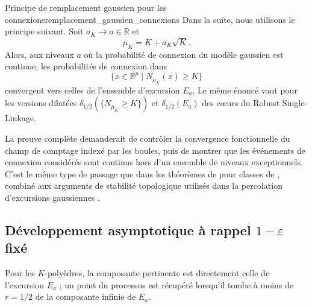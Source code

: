 \begin{Resultat}{Principe de remplacement gaussien pour les connexions}{remplacement_gaussien_connexions}
Dans la suite, nous utilisons le principe suivant. Soit $a_K\to a\in\mathbb R$ et
\[
    \mu_K=K+a_K\sqrt K.
\]
Alors, aux niveaux $a$ où la probabilité de connexion du modèle gaussien est continue, les probabilités de connexion dans
\[
    \{x \in \mathbb R^p \mid N_{\mu_K}(x)\ge K\}
\]
convergent vers celles de l'ensemble d'excursion $E_a$. Le même énoncé vaut pour les versions dilatées $\delta_{1/2}(\{N_{\mu_K}\ge K\})$ et $\delta_{1/2}(E_a)$ des cœurs du Robust Single-Linkage.
\end{Resultat}

\begin{Preuve}[Commentaire]
La preuve complète demanderait de contrôler la convergence fonctionnelle du champ de comptage indexé par les boules, puis de montrer que les événements de connexion considérés sont continus hors d'un ensemble de niveaux exceptionnels. C'est le même type de passage que dans les théorèmes de  pour classes de  \cite{VanDerVaartWellner1996}, combiné aux arguments de stabilité topologique utilisés dans la percolation d'excursions gaussiennes \cite{RiveraVanneuville2020, MuirheadVanneuville2020, MuirheadRiveraVanneuville2023, Severo2022}.
\end{Preuve}


\subsection{Développement asymptotique à rappel $1-\varepsilon$ fixé}

Pour les $K$-polyèdres, la composante pertinente est directement celle de l'excursion $E_a$ ; un point du processus est récupéré lorsqu'il tombe à moins de $r=1/2$ de la composante infinie de $E_a$.


